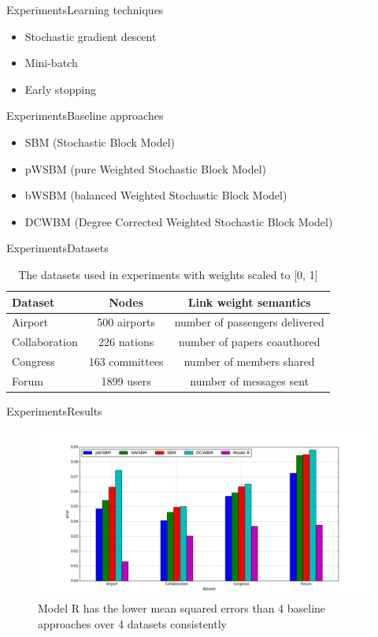\documentclass{beamer}
\begin{document}
\begin{frame}{Experiments}{Learning techniques}
	\begin{itemize}
		\item Stochastic gradient descent
		\item Mini-batch
		\item Early stopping
	\end{itemize}	
\end{frame}

\begin{frame}{Experiments}{Baseline approaches}
	\begin{itemize}
		\item SBM (Stochastic Block Model)
		\item pWSBM (pure Weighted Stochastic Block Model)
		\item bWSBM (balanced Weighted Stochastic Block Model)
		\item DCWBM (Degree Corrected Weighted Stochastic Block Model)
	\end{itemize}
\end{frame}

\begin{frame}{Experiments}{Datasets}
	\begin{table}[H]\centering
		\caption{The datasets used in experiments with weights scaled to [0, 1]}
		\begin{tabularx}{\textwidth}{|X|c|c|}  \hline
			Dataset & Nodes & Link weight semantics \\ \hline
			Airport & 500 airports & number of passengers delivered \\ \hline
			Collaboration & 226 nations & number of papers coauthored \\ \hline
			Congress & 163 committees  & number of members shared \\ \hline
			Forum  & 1899 users & number of messages sent \\ \hline
		\end{tabularx}
		\label{tab:datasets}
	\end{table}
\end{frame}

\begin{frame}{Experiments}{Results}
	\begin{figure}[H]\centering
		\includegraphics[width=\textwidth]{link-weight-errors}
		\caption{
			Model R has the lower mean squared errors than 4 baseline approaches over 4 datasets consistently
		}
		\label{fig:errors}
	\end{figure}
\end{frame}
\end{document}
